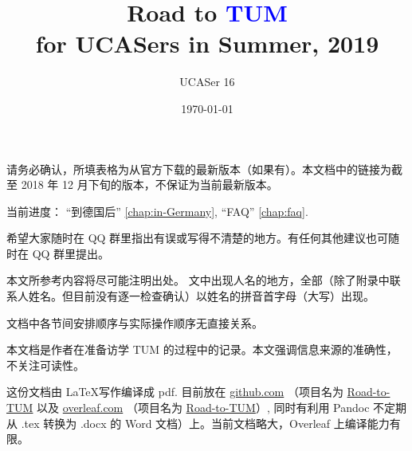 \documentclass[oneside,final]{book}
\title{\huge{Road to \textbf{\textcolor{blue}{TUM}}}\\for UCASers in Summer, 2019}
\author{UCASer 16}
\date{\today}
\begin{document}
\maketitle

请务必确认，所填表格为从官方下载的最新版本（如果有）。本文档中的链接为截至 2018 年 12 月下旬的版本，不保证为当前最新版本。

当前进度：
“到德国后” \ref{chap:in-Germany}, ``FAQ'' \ref{chap:faq}.

希望大家随时在 QQ 群里指出有误或写得不清楚的地方。有任何其他建议也可随时在 QQ 群里提出。


本文所参考内容将尽可能注明出处。%
文中出现人名的地方，全部（除了附录中联系人姓名。但目前没有逐一检查确认）以姓名的拼音首字母（大写）出现。

文档中各节间安排顺序与实际操作顺序无直接关系。
\vfill

本文档是作者在准备访学 TUM 的过程中的记录。本文强调信息来源的准确性，不关注可读性。

这份文档由 \LaTeX 写作编译成 pdf. 目前放在 \href{https://github.com}{github.com} （项目名为 \href{https://github.com/Memcys/Road-to-TUM.git}{Road-to-TUM} 以及 \href{https://www.overlear.com}{overleaf.com} （项目名为 \href{https://www.overleaf.com/2269426218fxwmgyxjywnn}{Road-to-TUM}）, 同时有利用 Pandoc 不定期从 .tex 转换为 .docx 的 Word 文档）上。当前文档略大，Overleaf 上编译能力有限。


\end{document}
